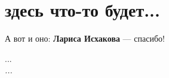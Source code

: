 \documentclass{article}
\begin{document}
\section*{здесь что-то будет...}

А вот и оно: \textbf{Лариса Исхакова} — спасибо!

\begin{center}
\Large \textsc{...} \\
\medskip
\emph{...}
\end{center}
\end{document}
